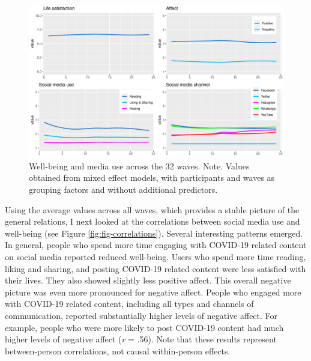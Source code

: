 \documentclass[
  man,floatsintext]{apa7}
\begin{document}
\begin{figure}
\includegraphics[width=\textwidth]{figures/fig_descriptives} \caption{Well-being and media use across the 32 waves. Note. Values obtained from mixed effect models, with participants and waves as grouping factors and without additional predictors.}\label{fig:fig-descriptives}
\end{figure}

Using the average values across all waves, which provides a stable picture of the general relations, I next looked at the correlations between social media use and well-being (see Figure \ref{fig:fig-correlations}).
Several interesting patterns emerged.
In general, people who spend more time engaging with COVID-19 related content on social media reported reduced well-being.
Users who spend more time reading, liking and sharing, and posting COVID-19 related content were less satisfied with their lives.
They also showed slightly less positive affect.
This overall negative picture was even more pronounced for negative affect.
People who engaged more with COVID-19 related content, including all types and channels of communication, reported substantially higher levels of negative affect.
For example, people who were more likely to post COVID-19 content had much higher levels of negative affect (\emph{r} = .56).
Note that these results represent between-person correlations, not causal within-person effects.
\end{document}

